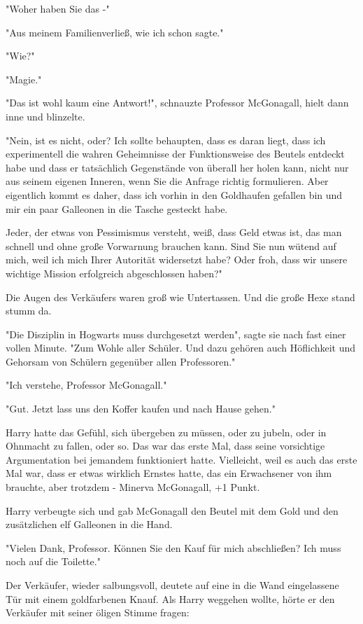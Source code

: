 {"Woher haben Sie das -"

"Aus meinem Familienverließ, wie ich schon sagte."

"Wie?"

"Magie."

"Das ist wohl kaum eine Antwort!", schnauzte Professor McGonagall, hielt dann inne und blinzelte.

"Nein, ist es nicht, oder? Ich sollte behaupten, dass es daran liegt, dass ich experimentell die wahren Geheimnisse der Funktionsweise des Beutels entdeckt habe und dass er tatsächlich Gegenstände von überall her holen kann, nicht nur aus seinem eigenen Inneren, wenn Sie die Anfrage richtig formulieren. Aber eigentlich kommt es daher, dass ich vorhin in den Goldhaufen gefallen bin und mir ein paar Galleonen in die Tasche gesteckt habe.

Jeder, der etwas von Pessimismus versteht, weiß, dass Geld etwas ist, das man schnell und ohne große Vorwarnung brauchen kann. Sind Sie nun wütend auf mich, weil ich mich Ihrer Autorität widersetzt habe? Oder froh, dass wir unsere wichtige Mission erfolgreich abgeschlossen haben?"

Die Augen des Verkäufers waren groß wie Untertassen. Und die große Hexe stand stumm da.

"Die Disziplin in Hogwarts muss durchgesetzt werden", sagte sie nach fast einer vollen Minute. "Zum Wohle aller Schüler. Und dazu gehören auch Höflichkeit und Gehorsam von Schülern gegenüber allen Professoren."

"Ich verstehe, Professor McGonagall."

"Gut. Jetzt lass uns den Koffer kaufen und nach Hause gehen."

Harry hatte das Gefühl, sich übergeben zu müssen, oder zu jubeln, oder in Ohnmacht zu fallen, oder so. Das war das erste Mal, dass seine vorsichtige Argumentation bei jemandem funktioniert hatte. Vielleicht, weil es auch das erste Mal war, dass er etwas wirklich Ernstes hatte, das ein Erwachsener von ihm brauchte, aber trotzdem - Minerva McGonagall, +1 Punkt.

Harry verbeugte sich und gab McGonagall den Beutel mit dem Gold und den zusätzlichen elf Galleonen in die Hand.

"Vielen Dank, Professor. Können Sie den Kauf für mich abschließen? Ich muss noch auf die Toilette."

Der Verkäufer, wieder salbungsvoll, deutete auf eine in die Wand eingelassene Tür mit einem goldfarbenen Knauf. Als Harry weggehen wollte, hörte er den Verkäufer mit seiner öligen Stimme fragen:

}
